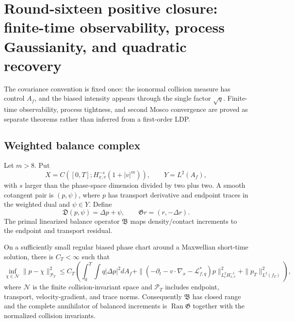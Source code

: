 \section{Round-sixteen positive closure: finite-time observability, process Gaussianity, and quadratic recovery}
\label{sec:r16-b3}

The covariance convention is fixed once: the isonormal collision measure has
control \(A_f\), and the biased intensity appears through the single factor
\(\sqrt q\).  Finite-time observability, process tightness, and second
Mosco convergence are proved as separate theorems rather than inferred from a
first-order LDP.

\subsection{Weighted balance complex}

Let \(m>8\).  Put
\[
 X=C([0,T];H^{-s}_{x,v}(1+|v|^m)),
 \qquad
 Y=L^2(A_f),
\]
with \(s\) larger than the phase-space dimension divided by two plus two.  A
smooth cotangent pair is \((p,\psi)\), where \(p\) has transport derivative and
endpoint traces in the weighted dual and \(\psi\in Y\).  Define
\[
 \mathfrak D(p,\psi)=\Delta p+\psi,
 \qquad
 \mathfrak G r=(r,-\Delta r).
\]
The primal linearized balance operator \(\mathfrak B\) maps density/contact
increments to the endpoint and transport residual.

\begin{theorem}
\label{thm:r16-b3-observability}
On a sufficiently small regular biased phase chart around a Maxwellian
short-time solution, there is \(C_T<\infty\) such that
\[
 \inf_{\chi\in\mathcal N}
 \|p-\chi\|_{\mathcal P_T}^2
 \le C_T\left(
 \int_0^T\!\int q|\Delta p|^2dA_f
 +\|(-\partial_t-v\cdot\nabla_x-\mathcal L_{f,q}^*)p
   \|_{L^2_tH^{-1}_{x,v}}^2
 +\|p_T\|_{L^2(f_T)}^2
 \right),
\]
where \(\mathcal N\) is the finite collision-invariant space and
\(\mathcal P_T\) includes endpoint, transport, velocity-gradient, and trace
norms.  Consequently \(\mathfrak B\) has closed range and the complete
annihilator of balanced increments is
\(\operatorname{Ran}\mathfrak G\) together with the normalized collision
invariants.
\end{theorem}

